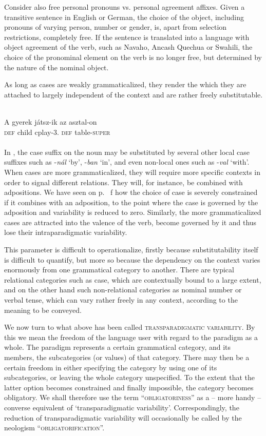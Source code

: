 Consider also free personal pronouns vs. personal agreement affixes. Given a transitive sentence in English or German, the choice of the object, including pronouns of varying person, number or gender, is, apart from selection restrictions, completely free. If the sentence is translated into a language with object agreement of the verb, such as Navaho, Ancash Quechua or Swahili, the choice of the pronominal element on the verb is no longer free, but determined by the nature of the nominal object.

As long as cases are weakly grammaticalized, they render the \np which they are attached to largely independent of the context and are rather freely substitutable.

\ea\label{ex:E104}
\langinfo{\LangHung}{}{} \\
\gll     A  gyerek  játsz-ik  az  asztal-on\\
\textsc{def}  child  {cplay-3.\glgen}  \textsc{def}  table-\textsc{super}\\
\\
\z
\newpage
\noindent In , the case suffix on the noun may be substituted by several other local case suffixes such as -\textit{nál} ‘by’, -\textit{ban} ‘in’, and even non-local ones such as -\textit{val} ‘with’. When cases are more grammaticalized, they will require more specific contexts in order to signal different relations. They will, for instance, be combined with adpositions. We have seen on p.~\pageref{page100c}\chk%
f how the choice of case is severely constrained if it combines with an adposition, to the point where the case is governed by the adposition and variability is reduced to zero. Similarly, the more grammaticalized cases are attracted into the valence of the verb, become governed by it and thus lose their intraparadigmatic variability.

This parameter is difficult to operationalize, firstly because substitutability itself is difficult to quantify, but more so because the dependency on the context varies enormously from one grammatical category to another. There are typical relational categories such as case, which are contextually bound to a large extent, and on the other hand such non-relational categories as nominal number or verbal tense, which can vary rather freely in any context, according to the meaning to be conveyed.

We now turn to what above has been called \textsc{transparadigmatic variability}. By this we mean the freedom of the language user with regard to the paradigm as a whole. The paradigm represents a certain grammatical category, and its members, the subcategories (or values) of that category. There may then be a certain freedom in either specifying the category by using one of its subcategories, or leaving the whole category unspecified. To the extent that the latter option becomes constrained and finally impossible, the category becomes obligatory. We shall therefore use the term ``\textsc{obligatoriness}'' as a -- more handy -- converse equivalent of ‘transparadigmatic variability’. Correspondingly, the reduction of transparadigmatic variability will occasionally be called by the neologism ``\textsc{obligatorification}''.

